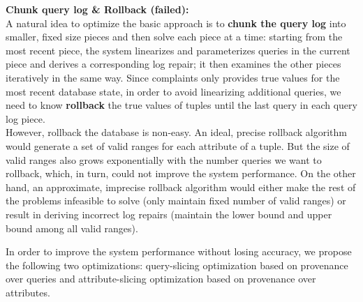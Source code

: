 \smallskip

\noindent \textbf{Chunk query log \& Rollback (failed):} \\
A natural idea to optimize the basic approach is 
to \textbf{chunk the query log} into
smaller, fixed size pieces and then solve each piece at a time: starting
from the most recent piece, the system linearizes and parameterizes queries 
in the current piece and derives a corresponding log repair; 
it then examines the other pieces iteratively
in the same way. Since complaints only provides
true values for the most recent database state, in order to avoid 
linearizing additional queries, 
we need to know \textbf{rollback} the true values of tuples 
until the last query in each query log piece. \\
However, rollback the database is non-easy. An ideal, precise rollback
algorithm would generate a set of valid ranges for each attribute of a tuple. 
But the size of valid ranges also grows exponentially with the number queries
we want to rollback, which, in turn, could not improve the system performance. 
On the other hand, an approximate, imprecise 
rollback algorithm would either make the rest of the problems
infeasible to solve (only maintain fixed number of valid ranges) 
or result in deriving 
incorrect log repairs (maintain the lower 
bound and upper bound among all valid ranges).
  
\smallskip

In order to improve the system performance without losing accuracy, we propose
the following two optimizations: query-slicing optimization 
based on provenance over queries and
attribute-slicing optimization based on provenance over 
attributes. 
